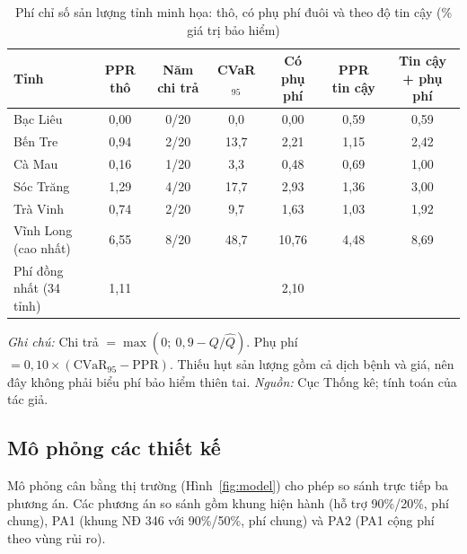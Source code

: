 \documentclass[12pt,a4paper]{article}
\begin{document}
\begin{table}[!tbp]
\centering\footnotesize
\caption{Phí chỉ số sản lượng tỉnh minh họa: thô, có phụ phí đuôi và theo độ tin cậy (\% giá trị bảo hiểm)}
\label{tab:premium}
\begin{tabular}{@{}lcccccc@{}}
\toprule
Tỉnh & PPR thô & Năm chi trả & CVaR$_{95}$ & Có phụ phí & PPR tin cậy & Tin cậy + phụ phí \\
\midrule
Bạc Liêu & 0,00 & 0/20 & 0,0 & 0,00 & 0,59 & 0,59 \\
Bến Tre & 0,94 & 2/20 & 13,7 & 2,21 & 1,15 & 2,42 \\
Cà Mau & 0,16 & 1/20 & 3,3 & 0,48 & 0,69 & 1,00 \\
Sóc Trăng & 1,29 & 4/20 & 17,7 & 2,93 & 1,36 & 3,00 \\
Trà Vinh & 0,74 & 2/20 & 9,7 & 1,63 & 1,03 & 1,92 \\
\midrule
Vĩnh Long (cao nhất) & 6,55 & 8/20 & 48,7 & 10,76 & 4,48 & 8,69 \\
\midrule
Phí đồng nhất (34 tỉnh) & 1,11 & & & 2,10 & & \\
\bottomrule
\end{tabular}
\begin{minipage}{\textwidth}\footnotesize
\textit{Ghi chú:} Chi trả $=\max(0;\ 0{,}9-Q/\hat Q)$. Phụ phí $=0{,}10\times(\mathrm{CVaR}_{95}-\mathrm{PPR})$. Thiếu hụt sản lượng gồm cả dịch bệnh và giá, nên đây không phải biểu phí bảo hiểm thiên tai. \textit{Nguồn:} Cục Thống kê; tính toán của tác giả.
\end{minipage}
\end{table}

\subsection{Mô phỏng các thiết kế}

Mô phỏng cân bằng thị trường (Hình~\ref{fig:model}) cho phép so sánh trực tiếp ba phương án. Các phương án so sánh gồm khung hiện hành (hỗ trợ 90\%/20\%, phí chung), PA1 (khung NĐ 346 với 90\%/50\%, phí chung) và PA2 (PA1 cộng phí theo vùng rủi ro).
\end{document}
